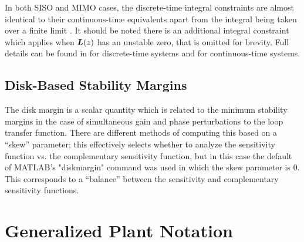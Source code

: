 In both SISO and MIMO cases, the discrete-time integral constraints are almost identical to their continuous-time equivalents apart from the integral being taken over a finite limit \cite{emami2019bode}.  It should be noted there is an additional integral constraint which applies when $\vb*{L}(z)$ has an unstable zero, that is omitted for brevity.  Full details can be found in \cite{chen2000logarithmic,emami2019bode} for discrete-time systems and \cite{freudenberg1985right, freudenberg1988frequency, boyd1991linear, chen1997logarithmic, chen1998logarithmic, stein2003respect, skogestad2005multivariable} for continuous-time systems.

\subsection{Disk-Based Stability Margins}
The disk margin is a scalar quantity which is related to the minimum stability margins in the case of simultaneous gain and phase perturbations to the loop transfer function.  There are different methods of computing this based on a ``skew'' parameter; this effectively selects whether to analyze the sensitivity function vs. the complementary sensitivity function, but in this case the default of MATLAB's "diskmargin" command was used in which the skew parameter is 0.  This corresponds to a ``balance'' between the sensitivity and complementary sensitivity functions.

\section{Generalized Plant Notation}
